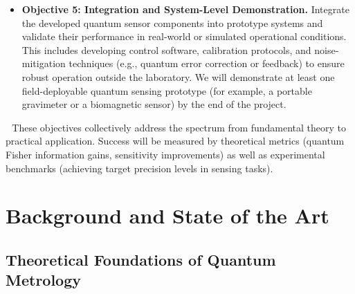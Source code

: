 \documentclass[12pt]{article}
\begin{document}
\begin{itemize}
\item \textbf{Objective 5: Integration and System-Level Demonstration.} Integrate the developed quantum sensor components into prototype systems and validate their performance in real-world or simulated operational conditions. This includes developing control software, calibration protocols, and noise-mitigation techniques (e.g., quantum error correction or feedback) to ensure robust operation outside the laboratory. We will demonstrate at least one field-deployable quantum sensing prototype (for example, a portable gravimeter or a biomagnetic sensor) by the end of the project.
\end{itemize}
  These objectives collectively address the spectrum from fundamental
theory to practical application. Success will be measured by
theoretical metrics (quantum Fisher information gains, sensitivity
improvements) as well as experimental benchmarks (achieving target
precision levels in sensing tasks).   

\section{Background and State of the Art}
\subsection{Theoretical Foundations of Quantum Metrology}
\end{document}
